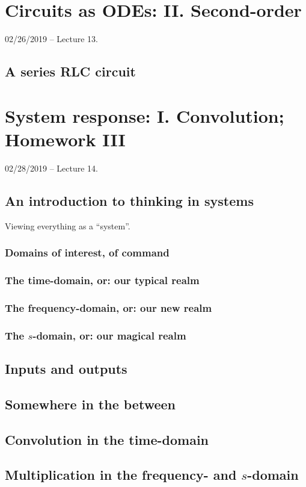 \documentclass[11pt]{book}
\begin{document}
\chapter{Circuits as ODEs: II. Second-order}
02/26/2019 – Lecture 13. 
\section{A series RLC circuit}



\chapter{System response: I. Convolution; Homework III}
02/28/2019 – Lecture 14. 
\section{An introduction to thinking in systems}
Viewing everything as a ``system''. 
\subsection{Domains of interest, of command}
\subsection{The time-domain, or: our typical realm}
\subsection{The frequency-domain, or: our new realm}
\subsection{The $s$-domain, or: our magical realm}
\section{Inputs and outputs}
\section{Somewhere in the between}
\section{Convolution in the time-domain}
\section{Multiplication in the frequency- and $s$-domain}
\end{document}
